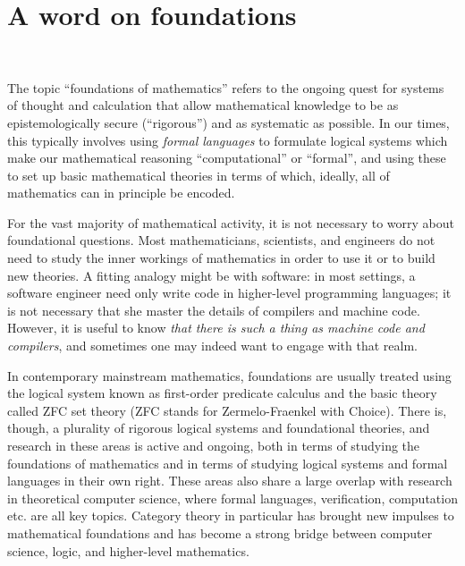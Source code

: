 

\section{A word on foundations}\label{sec:foundations}



\

The topic ``foundations of mathematics'' refers to the ongoing quest for systems of thought and calculation that allow mathematical knowledge to be as epistemologically secure (``rigorous'') and as systematic as possible. In our times, this typically involves using \emph{formal languages} to formulate logical systems which make our mathematical reasoning ``computational'' or ``formal'', and using these to set up basic mathematical theories in terms of which, ideally, all of mathematics can in principle be encoded. 

For the vast majority of mathematical activity, it is not necessary to worry about foundational questions. Most mathematicians, scientists, and engineers do not need to study the inner workings of mathematics in order to use it or to build new theories. A fitting analogy might be with software: in most settings, a software engineer need only write code in higher-level programming languages; it is not necessary that she master the details of compilers and machine code. However, it is useful to know \emph{that there is such a thing as machine code and compilers}, and sometimes one may indeed want to engage with that realm. 

In contemporary mainstream mathematics, foundations are usually treated using the logical system known as first-order predicate calculus and the basic theory called ZFC set theory (ZFC stands for Zermelo-Fraenkel with Choice). There is, though, a plurality of rigorous logical systems and foundational theories, and research in these areas is active and ongoing, both in terms of studying the foundations of mathematics and in terms of studying logical systems and formal languages in their own right. These areas also share a large overlap with research in theoretical computer science, where formal languages, verification, computation etc. are all key topics. Category theory in particular has brought new impulses to mathematical foundations and has become a strong bridge between computer science, logic, and higher-level mathematics. 

